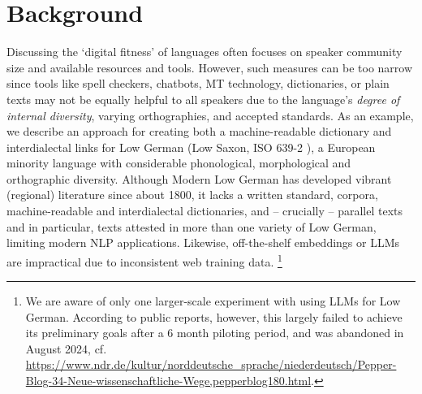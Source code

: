 \section{Background}

Discussing the `digital fitness' of languages \cite{soria2016fostering}
often focuses on speaker community size and available resources and tools. However, such measures can be too narrow since tools like spell checkers, chatbots, MT technology, dictionaries, or plain texts may not be equally  helpful to all speakers due to the language's \emph{degree of internal diversity}, varying orthographies, and accepted standards.
As an example, we describe an approach for creating both a machine-readable dictionary and interdialectal links for Low German (Low Saxon, ISO 639-2 ), a European minority language with considerable phonological, morphological and orthographic diversity. Although Modern Low German has developed vibrant (regional) literature since about 1800, it lacks a written standard, corpora, machine-readable and interdialectal dictionaries, and -- crucially -- parallel texts and in particular, texts attested in more than one variety of Low German, limiting modern NLP applications. Likewise, off-the-shelf embeddings or LLMs are impractical due to inconsistent web training data.
\footnote{
    We are aware of only one larger-scale experiment with using LLMs for Low German. According to public reports, however, this largely failed to achieve its preliminary goals after a 6 month piloting period, and was abandoned in August 2024, cf. \url{https://www.ndr.de/kultur/norddeutsche_sprache/niederdeutsch/Pepper-Blog-34-Neue-wissenschaftliche-Wege,pepperblog180.html}.
}


